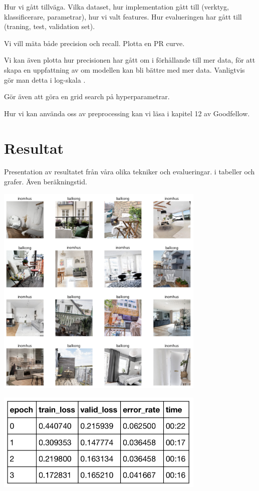 \documentclass{kththesis}
\begin{document}
Hur vi gått tillväga. Vilka dataset, hur implementation gått till (verktyg, klassificerare, parametrar), hur vi valt features.
Hur evalueringen har gått till (traning, test, validation set).

Vi vill mäta både precision och recall. Plotta en PR curve.

Vi kan även plotta hur precisionen har gått om i förhållande till mer data, för att skapa en uppfattning av om modellen kan bli bättre med mer data. Vanligtvis gör man detta i log-skala \parencite{Goodfellow-et-al-2016}. 

Gör även att göra en grid search på hyperparametrar.

Hur vi kan använda oss av preprocessing kan vi  läsa i kapitel 12 av Goodfellow.

\chapter{Resultat}
Presentation av resultatet från våra olika tekniker och evalueringar. i tabeller och grafer. Även beräkningstid. 

\includegraphics[width=10cm]{../images/1.png}

\includegraphics[width=10cm]{../images/2.png}
\end{document}
